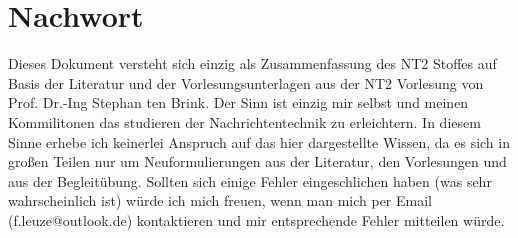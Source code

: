 \section{Nachwort}
Dieses Dokument versteht sich einzig als Zusammenfassung des NT2 Stoffes auf Basis der Literatur und der Vorlesungsunterlagen aus der NT2 Vorlesung von Prof. Dr.-Ing Stephan ten Brink. Der Sinn ist einzig mir selbst und meinen Kommilitonen das studieren der Nachrichtentechnik zu erleichtern. In diesem Sinne erhebe ich keinerlei Anspruch auf das hier dargestellte Wissen, da es sich in großen Teilen nur um Neuformulierungen aus der Literatur, den Vorlesungen und aus der Begleitübung. Sollten sich einige Fehler eingeschlichen haben (was sehr wahrscheinlich ist) würde ich mich freuen, wenn man mich per Email (f.leuze@outlook.de) kontaktieren und mir entsprechende Fehler mitteilen würde.